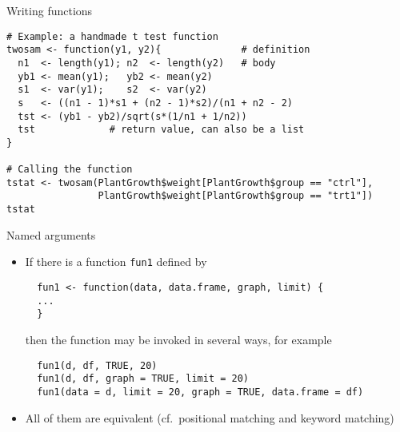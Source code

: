 \documentclass[aspectratio=169]{beamer}
\begin{document}
\begin{frame}[fragile]{Writing functions}
\begin{lstlisting}
# Example: a handmade t test function
twosam <- function(y1, y2){              # definition
  n1  <- length(y1); n2  <- length(y2)   # body
  yb1 <- mean(y1);   yb2 <- mean(y2)
  s1  <- var(y1);    s2  <- var(y2)
  s   <- ((n1 - 1)*s1 + (n2 - 1)*s2)/(n1 + n2 - 2)
  tst <- (yb1 - yb2)/sqrt(s*(1/n1 + 1/n2))
  tst             # return value, can also be a list
}

# Calling the function
tstat <- twosam(PlantGrowth$weight[PlantGrowth$group == "ctrl"],
                PlantGrowth$weight[PlantGrowth$group == "trt1"])
tstat
\end{lstlisting}
  \nocite{Venables2022}
\end{frame}

\begin{frame}[fragile]{Named arguments}
  \begin{itemize}
    \item If there is a function \texttt{fun1} defined by

\begin{lstlisting}
  fun1 <- function(data, data.frame, graph, limit) { 
  ...
  }
\end{lstlisting}

then the function may be invoked in several ways, for example

\begin{lstlisting}
  fun1(d, df, TRUE, 20)
  fun1(d, df, graph = TRUE, limit = 20)
  fun1(data = d, limit = 20, graph = TRUE, data.frame = df)
\end{lstlisting}

    \item All of them are equivalent (cf.\ positional matching and keyword
      matching)
  \end{itemize}
\end{frame}
\end{document}
